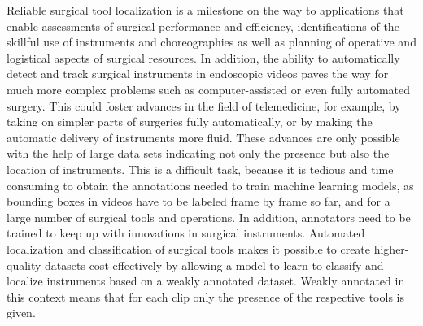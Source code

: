 Reliable surgical tool localization is a milestone on the way to applications that enable assessments of surgical performance and efficiency, identifications of the skillful use of instruments and choreographies as well as planning of operative and logistical aspects of surgical resources. In addition, the ability to automatically detect and track surgical instruments in endoscopic videos paves the way for much more complex problems such as computer-assisted or even fully automated surgery. This could foster advances in the field of telemedicine, for example, by taking on simpler parts of surgeries fully automatically, or by making the automatic delivery of instruments more fluid. These advances are only possible with the help of large data sets indicating not only the presence but also the location of instruments. This is a difficult task, because it is tedious and time consuming to obtain the annotations needed to train machine learning models, as bounding boxes in videos have to be labeled frame by frame so far, and for a large number of surgical tools and operations. In addition, annotators need to be trained to keep up with innovations in surgical instruments. Automated localization and classification of surgical tools makes it possible to create higher-quality datasets cost-effectively by allowing a model to learn to classify and localize instruments based on a weakly annotated dataset. Weakly annotated in this context means that for each clip only the presence of the respective tools is given.